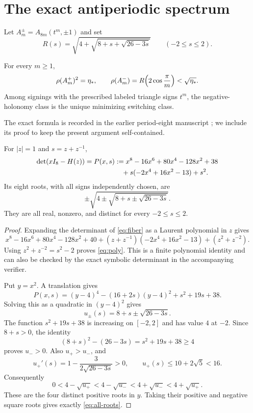 \section{The exact antiperiodic spectrum}\label{sec:period8}

Let $A_m^\pm=A_{8m}(t^m,\pm1)$ and set
\[
 R(s)=\sqrt{4+\sqrt{8+s+\sqrt{26-3s}}}\qquad(-2\le s\le2).
\]
\begin{theorem}\label{thm:period8}
For every $m\ge1$,
\begin{equation}
 \rho(A_m^+)^2=\eta_*,
 \qquad \rho(A_m^-)=R\!\left(2\cos\frac\pi m\right)<\sqrt{\eta_*}.
 \label{eq:main}
\end{equation}
Among signings with the prescribed labeled triangle signs $t^m$, the
negative-holonomy class is the unique minimizing switching class.
\end{theorem}
The exact formula is recorded in the earlier period-eight manuscript
\cite{EarlierPeriodEight}; we include its proof to keep the present
argument self-contained.

\begin{lemma}\label{lem:poly}
For $|z|=1$ and $s=z+z^{-1}$,
\begin{align}
 \det(xI_8-H(z))=P(x,s)
  &:=x^8-16x^6+80x^4-128x^2+38 \notag\\
  &\quad+s(-2x^4+16x^2-13)+s^2.
 \label{eq:poly}
\end{align}
Its eight roots, with all signs independently chosen, are
\begin{equation}
 \pm\sqrt{4\pm\sqrt{8+s\pm\sqrt{26-3s}}}.
 \label{eq:all-roots}
\end{equation}
They are all real, nonzero, and distinct for every $-2\le s\le2$.
\end{lemma}
\begin{proof}
Expanding the determinant of \eqref{eq:fiber} as a Laurent polynomial
in $z$ gives
\[
 x^8-16x^6+80x^4-128x^2+40
 +(z+z^{-1})(-2x^4+16x^2-13)+(z^2+z^{-2}).
\]
Using $z^2+z^{-2}=s^2-2$ proves \eqref{eq:poly}.
This is a finite polynomial identity and can also be checked by the exact
symbolic determinant in the accompanying verifier.

Put $y=x^2$. A translation gives
\begin{equation}
 P(x,s)=(y-4)^4-(16+2s)(y-4)^2+s^2+19s+38.
 \label{eq:centered}
\end{equation}
Solving this as a quadratic in $(y-4)^2$ gives
\[
 u_\pm(s)=8+s\pm\sqrt{26-3s}.
\]
The function $s^2+19s+38$ is increasing on $[-2,2]$ and has value $4$
at $-2$. Since $8+s>0$, the identity
\[
 (8+s)^2-(26-3s)=s^2+19s+38\ge4
\]
proves $u_->0$. Also $u_+>u_-$, and
\[
 u_+'(s)=1-\frac3{2\sqrt{26-3s}}>0,
 \qquad u_+(s)\le10+2\sqrt5<16.
\]
Consequently
\[
 0<4-\sqrt{u_+}<4-\sqrt{u_-}
   <4+\sqrt{u_-}<4+\sqrt{u_+}.
\]
These are the four distinct positive roots in $y$. Taking their positive
and negative square roots gives exactly \eqref{eq:all-roots}.
\end{proof}

